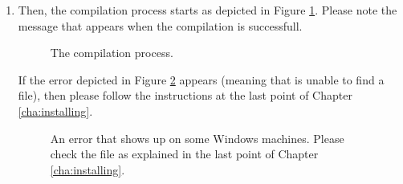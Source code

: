 \begin{enumerate}
\item
  Then, the compilation process starts as depicted in Figure
  \ref{fig:compiling}. Please note the message that appears when the
  compilation is successfull.
%
\begin{figure}[htb]
\caption{The compilation process.}
\label{fig:compiling}
\end{figure}

\begin{note}
  If the error depicted in Figure \ref{fig:mymake_cygwin_error} appears (meaning
  that  is unable to find a file), then please
  follow the instructions at the last point of Chapter
  \ref{cha:installing}.
\end{note}
%
\begin{figure}[htb]
\caption{An error that shows up on some Windows machines. Please check 
the  file as explained in the last 
point of Chapter \ref{cha:installing}.}
\label{fig:mymake_cygwin_error}
\end{figure}


\end{enumerate}

